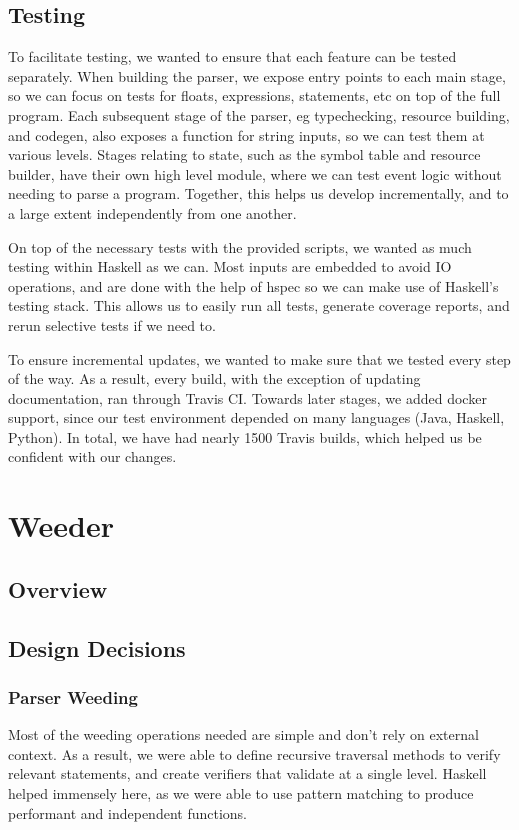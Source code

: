 \documentclass[11pt]{article}
\begin{document}
\subsection{Testing} 

To facilitate testing, we wanted to ensure that each feature can
be tested separately.
When building the parser, we expose entry points to each main stage,
so we can focus on tests for floats, expressions, statements, etc 
on top of the full program.
Each subsequent stage of the parser, eg typechecking, resource building, and codegen, also exposes a function for string inputs, so we can test them at various levels.
Stages relating to state, such as the symbol table and resource builder,
have their own high level module, where we can test event logic without 
needing to parse a program. Together, this helps us develop incrementally,
and to a large extent independently from one another.

On top of the necessary tests with the provided scripts, we wanted as much
testing within Haskell as we can. Most inputs are embedded to avoid IO operations, and are done with the help of hspec so we can make use of Haskell's testing stack. This allows us to easily run all tests,
generate coverage reports, and rerun selective tests if we need to.

To ensure incremental updates, we wanted to make sure that we tested every step of the way. As a result, every build, with the exception of updating documentation, ran through Travis CI.
Towards later stages, we added docker support, since our test environment depended on many languages (Java, Haskell, Python).
In total, we have had nearly 1500 Travis builds, which helped us be confident with our changes.

\section{Weeder}
\subsection{Overview} %
\subsection{Design Decisions}
\subsubsection{Parser Weeding}
Most of the weeding operations needed are simple and don't rely on
external context. As a result, we were able to define recursive
traversal methods to verify relevant statements, and create verifiers
that validate at a single level. Haskell helped immensely here, as we
were able to use pattern matching to produce performant and
independent functions.
\end{document}
